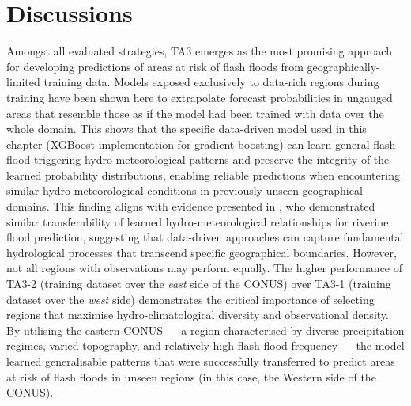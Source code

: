 \section{Discussions}
\label{regional_to_global_training_discussions}

Amongst  all evaluated strategies, TA3 emerges as the most promising approach for developing predictions of areas at risk of flash floods from geographically-limited training data. Models exposed exclusively to data-rich regions during training have been shown here to extrapolate forecast probabilities in ungauged areas that resemble those as if the model had been trained with data over the whole domain. This shows that the specific data-driven model used in this chapter (XGBoost implementation for gradient boosting) can learn general flash-flood-triggering hydro-meteorological patterns and preserve the integrity of the learned probability distributions, enabling reliable predictions when encountering similar hydro-meteorological conditions in previously unseen geographical domains. This finding aligns with evidence presented in \citet{Kratzert_2024}, who demonstrated similar transferability of learned hydro-meteorological relationships for riverine flood prediction, suggesting that data-driven approaches can capture fundamental hydrological processes that transcend specific geographical boundaries. However, not all regions with observations may perform equally. The higher performance of TA3-2 (training dataset over the \textit{east} side of the CONUS) over TA3-1 (training dataset over the \textit{west} side) demonstrates the critical importance of selecting regions that maximise hydro-climatological diversity and observational density. By utilising the eastern CONUS — a region characterised by diverse precipitation regimes, varied topography, and relatively high flash flood frequency — the model learned generalisable patterns that were successfully transferred to predict areas at risk of flash floods in unseen regions (in this case, the Western side of the CONUS). 

